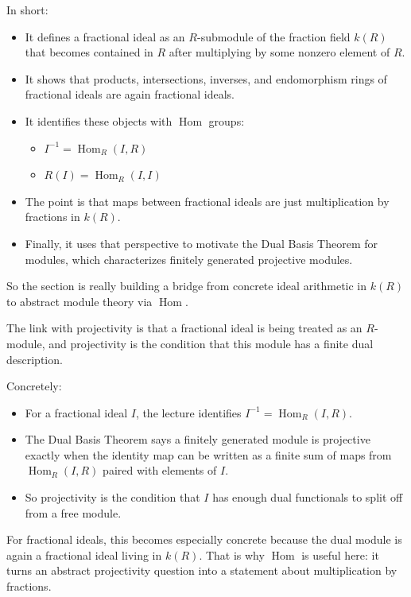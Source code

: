 \medskip\noindent
In short:
\begin{itemize}
\item It defines a fractional ideal as an
$R$-submodule of the fraction field $k(R)$
that becomes contained in $R$ after
multiplying by some nonzero element of $R$.
\item It shows that products, intersections,
inverses, and endomorphism rings of
fractional ideals are again fractional
ideals.
\item It identifies these objects with
$\operatorname{Hom}$ groups:
\begin{itemize}
\item $I^{-1} = \operatorname{Hom}_R(I,R)$
\item $R(I) = \operatorname{Hom}_R(I,I)$
\end{itemize}
\item The point is that maps between
fractional ideals are just multiplication by
fractions in $k(R)$.
\item Finally, it uses that perspective to
motivate the Dual Basis Theorem for modules,
which characterizes finitely generated
projective modules.
\end{itemize}

\noindent
So the section is really building a bridge
from concrete ideal arithmetic in $k(R)$ to
abstract module theory via $\operatorname{Hom}$.

\medskip\noindent
The link with projectivity is that a
fractional ideal is being treated as an
$R$-module, and projectivity is the condition
that this module has a finite dual
description.

\medskip\noindent
Concretely:
\begin{itemize}
\item For a fractional ideal $I$, the lecture
identifies $I^{-1}=\operatorname{Hom}_R(I,R)$.
\item The Dual Basis Theorem says a finitely
generated module is projective exactly when
the identity map can be written as a finite
sum of maps from $\operatorname{Hom}_R(I,R)$
paired with elements of $I$.
\item So projectivity is the condition that
$I$ has enough dual functionals to split off
from a free module.
\end{itemize}

\medskip\noindent
For fractional ideals, this becomes especially
concrete because the dual module is again a
fractional ideal living in $k(R)$. That is why
$\operatorname{Hom}$ is useful here: it turns
an abstract projectivity question into a
statement about multiplication by fractions.


